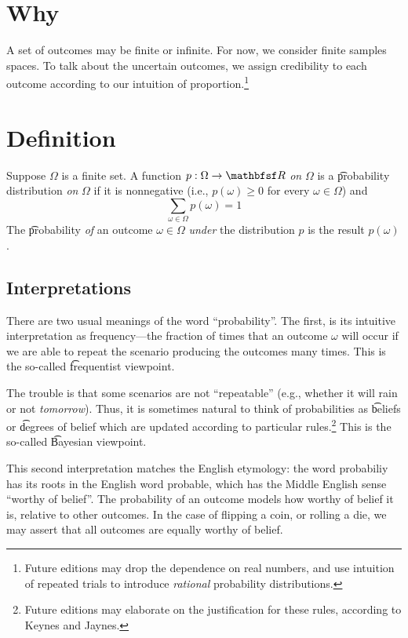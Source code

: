 
\section*{Why}

A set of outcomes may be finite or infinite.
For now, we consider finite samples spaces.
To talk about the uncertain outcomes, we assign credibility to each outcome according to our intuition of proportion.\footnote{Future editions may drop the dependence on real numbers, and use intuition of repeated trials to introduce \textit{rational} probability distributions.}

\section*{Definition}

Suppose $\Omega $ is a finite set.
A function $p: \Omega  \to \R $ \textit{on} $\Omega $ is a \t{probability distribution} \textit{on} $\Omega $ if it is nonnegative (i.e., $p(\omega ) \geq 0$ for every $\omega  \in \Omega $) and
\[
\textstyle
\sum_{\omega  \in \Omega } p(\omega ) = 1
\]
The \t{probability} \textit{of} an outcome $\omega  \in \Omega $ \textit{under} the distribution $p$ is the result $p(\omega )$.

\subsection*{Interpretations}

There are two usual meanings of the word ``probability''.
The first, is its intuitive interpretation as frequency---the fraction of times that an outcome $\omega $ will occur if we are able to repeat the scenario producing the outcomes many times.
This is the so-called \t{frequentist viewpoint}.

The trouble is that some scenarios are not ``repeatable'' (e.g., whether it will rain or not \textit{tomorrow}).
Thus, it is sometimes natural to think of probabilities as \t{beliefs} or \t{degrees of belief} which are updated according to particular rules.\footnote{Future editions may elaborate on the justification for these rules, according to Keynes and Jaynes.}
This is the so-called \t{Bayesian viewpoint}.

This second interpretation matches the English etymology: the word probabiliy has its roots in the English word probable, which has the Middle English sense ``worthy of belief''.
The probability of an outcome models how worthy of belief it is, relative to other outcomes.
In the case of flipping a coin, or rolling a die, we may assert that all outcomes are equally worthy of belief.

